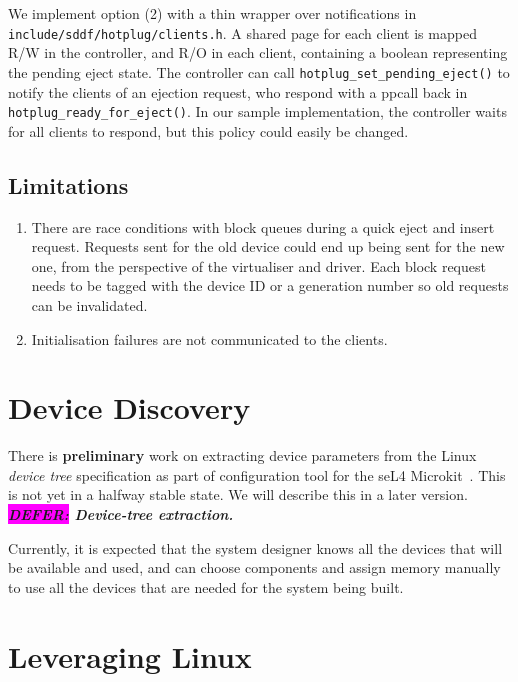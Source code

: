 \documentclass[a4paper,12pt]{report}
\newcommand{\DEFER}[1]{\textbf{\textsl{\colorbox{magenta}{DEFER:} #1}}}
\newcommand{\DEFER}[1]{\relax}
\begin{document}
We implement option (2) with a thin wrapper over notifications in
\texttt{include/sddf/hotplug/clients.h}. A shared page for each client
is mapped R/W in the controller, and R/O in each client, containing a
boolean representing the pending eject state. The controller can call
\texttt{hotplug\_set\_pending\_eject()} to notify the clients of an
ejection request, who respond with a ppcall back in
\texttt{hotplug\_ready\_for\_eject()}. In our sample implementation, the
controller waits for all clients to respond, but this policy could
easily be changed.

\section{Limitations}

\begin{enumerate}
  \item There are race conditions with block queues during a quick eject and insert request.
        Requests sent for the old device could end up being sent for the new one,
        from the perspective of the virtualiser and driver.
        Each block request needs to be tagged with the device ID or a generation
        number so old requests can be invalidated.

  \item Initialisation failures are not communicated to the clients.
\end{enumerate}


\chapter{Device Discovery}\label{s:discovery}

There is \textbf{preliminary} work on extracting device parameters
from the Linux \emph{device tree} specification as part of
configuration tool for the seL4 Microkit~\citep{microkit:url}.
This is not yet in a halfway stable state. We will
describe this in a later version. \DEFER{Device-tree extraction.}

Currently, it is expected that the system designer knows all the
devices that will be available and used, and can choose components and
assign memory manually to use all the devices that are needed for the
system being built.

\chapter{Leveraging Linux}\label{s:linux}
\end{document}
